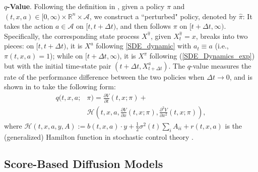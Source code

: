 \documentclass{article}
\theoremstyle{plain}
\theoremstyle{definition}
\theoremstyle{remark}
\begin{document}
\textbf{$q$-Value}.
Following the definition in \cite{jia2022q_learning}, 
given a policy $\pi$ and $(t,x, a) \in [0,\infty)\times\mathbb{R}^n \times \mathcal{A}$, we construct a ``perturbed" policy, denoted by $\hat{\pi}$: It takes the action $a \in \mathcal{A}$ on $[t, t+\Delta t)$, and then follows $\pi$ on $[t+\Delta t, \infty)$. 
Specifically, the corresponding state process $X^{\hat{\pi}}$, given $X_t^{\hat{\pi}}=x$, 
breaks into two pieces: on $[t, t+\Delta t)$, it is $X^a$ following \eqref{SDE_dynamic} with $a_t\equiv a$ 
(i.e., $\pi(t,x,a)=1$);
while on $[t+\Delta t, \infty)$, it is $X^\pi$ following (\ref{SDE_Dynamics_exp}) 
but with the initial time-state pair $\left(t+\Delta t, X_{t+\Delta t}^a\right)$.
The $q$-value measures the rate of the performance difference between the two policies when $\Delta t\to 0$, and is shown in \cite{jia2022q_learning} to take the following form:
\begin{align}
\label{defqvalue}
q(t, x, a ;& \pi)=\frac{\partial V}{\partial t}\left(t, x ; \pi\right)+ \nonumber\\
&\mathcal{H}\left(t, x, a, \frac{\partial V}{\partial x}\left(t,x ; \pi\right), \frac{\partial^2 V}{\partial x^2}\left(t,x ; \pi\right)\right),
\end{align}
where $\mathcal{H}(t, x, a, y, A):=b(t, x, a) \cdot y+\frac{1}{2} \sigma^2(t) \sum_{i} A_{ii}+r(t, x, a)$ is the (generalized) Hamilton function in stochastic control theory \cite{yong1999stochastic}. 

\subsection{Score-Based Diffusion Models}
\end{document}
